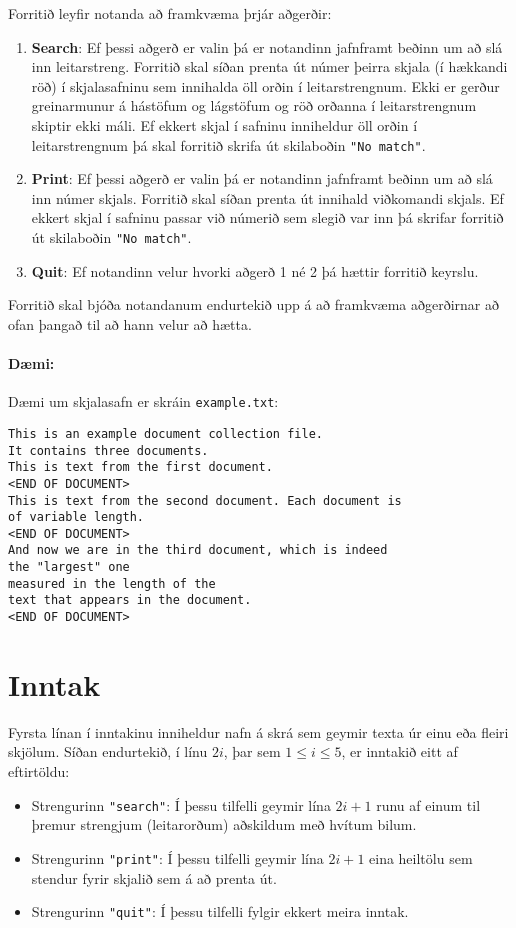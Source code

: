 Forritið leyfir notanda að framkvæma þrjár aðgerðir:
\begin{enumerate}
    \item \textbf{Search}: Ef þessi aðgerð er valin þá er notandinn jafnframt beðinn um að slá inn leitarstreng. 
    Forritið skal síðan prenta út númer þeirra skjala (í hækkandi röð) í skjalasafninu sem innihalda öll orðin í leitarstrengnum.
    Ekki er gerður greinarmunur á hástöfum og lágstöfum og röð orðanna í leitarstrengnum skiptir ekki máli. 
    Ef ekkert skjal í safninu inniheldur öll orðin í leitarstrengnum þá skal forritið skrifa út skilaboðin \texttt{"No match"}.
    \item \textbf{Print}: Ef þessi aðgerð er valin þá er notandinn jafnframt beðinn um að slá inn númer skjals. 
    Forritið skal síðan prenta út innihald viðkomandi skjals. 
    Ef ekkert skjal í safninu passar við númerið sem slegið var inn þá skrifar forritið út skilaboðin \texttt{"No match"}.
    \item \textbf{Quit}: Ef notandinn velur hvorki aðgerð 1 né 2 þá hættir forritið keyrslu.
\end{enumerate}

Forritið skal bjóða notandanum endurtekið upp á að framkvæma aðgerðirnar að ofan þangað til að hann velur að hætta.

\paragraph{Dæmi:}
Dæmi um skjalasafn er skráin \texttt{example.txt}: 

\begin{verbatim}
This is an example document collection file.
It contains three documents.
This is text from the first document.
<END OF DOCUMENT>
This is text from the second document. Each document is 
of variable length.
<END OF DOCUMENT>
And now we are in the third document, which is indeed 
the "largest" one 
measured in the length of the
text that appears in the document.
<END OF DOCUMENT>   
\end{verbatim}


\section*{Inntak}
Fyrsta línan í inntakinu inniheldur nafn á skrá sem geymir texta úr einu eða fleiri skjölum.
Síðan endurtekið, í línu $2i$, þar sem $1 \le i \le 5$, er inntakið eitt af eftirtöldu:
\begin{itemize}
    \item Strengurinn \texttt{"search"}: Í þessu tilfelli geymir lína $2i + 1$ runu af einum til þremur strengjum (leitarorðum) aðskildum með hvítum bilum.
    \item Strengurinn \texttt{"print"}: Í þessu tilfelli geymir lína $2i + 1$ eina heiltölu sem stendur fyrir skjalið sem á að prenta út.
    \item Strengurinn \texttt{"quit"}: Í þessu tilfelli fylgir ekkert meira inntak.
\end{itemize}    


